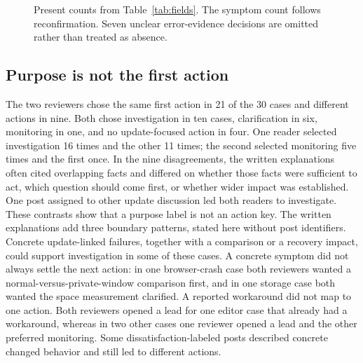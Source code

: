 \documentclass[conference,letterpaper]{IEEEtran}
\begin{document}
\begin{figure}[t]
\centering
{}
\caption{Present counts from Table~\ref{tab:fields}. The symptom count follows reconfirmation. Seven unclear error-evidence decisions are omitted rather than treated as absence.}
\label{fig:fields}
\end{figure}

\subsection{Purpose is not the first action}
The two reviewers chose the same first action in 21 of the 30 cases and different actions in nine. Both chose investigation in ten cases, clarification in six, monitoring in one, and no update-focused action in four. One reader selected investigation 16 times and the other 11 times; the second selected monitoring five times and the first once. In the nine disagreements, the written explanations often cited overlapping facts and differed on whether those facts were sufficient to act, which question should come first, or whether wider impact was established. One post assigned to other update discussion led both readers to investigate. These contrasts show that a purpose label is not an action key. The written explanations add three boundary patterns, stated here without post identifiers. Concrete update-linked failures, together with a comparison or a recovery impact, could support investigation in some of these cases. A concrete symptom did not always settle the next action: in one browser-crash case both reviewers wanted a normal-versus-private-window comparison first, and in one storage case both wanted the space measurement clarified. A reported workaround did not map to one action. Both reviewers opened a lead for one editor case that already had a workaround, whereas in two other cases one reviewer opened a lead and the other preferred monitoring. Some dissatisfaction-labeled posts described concrete changed behavior and still led to different actions.
\end{document}
